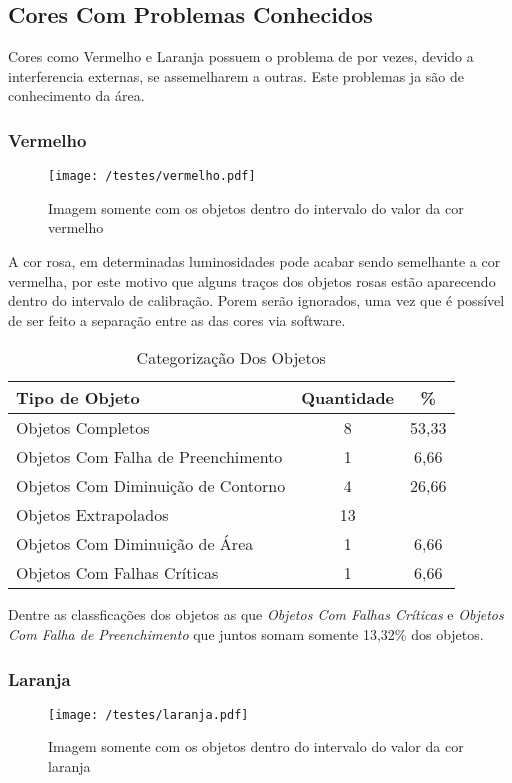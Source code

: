 \subsection{Cores Com Problemas Conhecidos}
Cores como Vermelho e Laranja possuem o problema de por vezes, devido a interferencia externas, se assemelharem a outras. Este problemas ja são de conhecimento da área.
	
	
\subsubsection{Vermelho}
	\begin{figure}[H]
		\centering
		\texttt{[image: /testes/vermelho.pdf]}
		\caption{Imagem somente com os objetos dentro do intervalo do valor da cor vermelho}
		\label{disposicaoparte}
	\end{figure}

A cor rosa, em determinadas luminosidades pode acabar sendo semelhante a cor vermelha, por este motivo que alguns traços dos objetos rosas estão aparecendo dentro do intervalo de calibração. Porem serão ignorados, uma vez que é possível de ser feito a separação entre as das cores via software.	

	
	\begin{table}[h]
\centering
\begin{tabular}{l|c|c}
Tipo de Objeto & Quantidade  & \% \\ %
\hline                               %
Objetos Completos &  8 & 53,33 \\
\hline 
Objetos Com Falha de Preenchimento & 1 & 6,66 \\
\hline 
Objetos Com Diminuição de Contorno &  4 & 26,66 \\
\hline 
Objetos Extrapolados &  13 \\
\hline 
Objetos Com Diminuição de Área &  1 &6,66 \\
\hline 
Objetos Com Falhas Críticas &  1 & 6,66\\
\hline 
\end{tabular}
\caption{Categorização Dos Objetos}
\end{table}

Dentre as classficações dos objetos as que  \textit{Objetos Com Falhas Críticas} e \textit{Objetos Com Falha de Preenchimento} que juntos somam somente 13,32\% dos objetos.

\subsubsection{Laranja}
	\begin{figure}[H]
		\centering
		\texttt{[image: /testes/laranja.pdf]}
		\caption{Imagem somente com os objetos dentro do intervalo do valor da cor laranja}
		\label{disposicaoparte}
	\end{figure}
	

